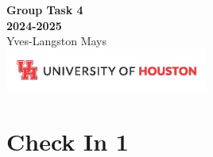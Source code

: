 \documentclass{report}
\begin{document}
\begin{titlepage}
    \centering
    \vspace*{5cm}
    {\Huge \textbf{Group Task 4\\[0.5em] 2024-2025}} \\[1.5em]
    {\Large Yves-Langston Mays} \\[2.5em]
    \vfill
    \includegraphics[width=0.5\textwidth]{UHLogo_Long.png}
    \vspace{0.8cm}
\end{titlepage}

\begingroup
\let\clearpage\relax
\tableofcontents
\endgroup
\relax
\relax

\newpage

\section{Check In 1}\label{check-in-1}
\end{document}
